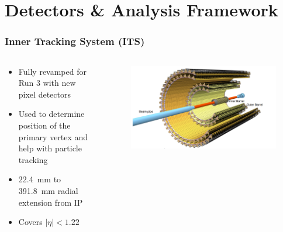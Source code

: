 \documentclass[11pt]{beamer}
\begin{document}
\section{Detectors \& Analysis Framework}

\begin{frame}
    \frametitle{Inner Tracking System (ITS)}

    \begin{columns}[c]
        \begin{column}{0.4\textwidth}
            \begin{itemize}
                \item Fully revamped for Run 3 with new pixel detectors
                \item Used to determine position of the primary vertex and help with particle tracking
                \item \SI{22.4}{\milli\metre} to \SI{391.8}{\milli\metre} radial extension from IP
                \item Covers $|\eta| < 1.22$
            \end{itemize}
        \end{column}

        \begin{column}{0.6\textwidth}
            \begin{figure}[h]
                \begin{center}
                    \includegraphics[width=\textwidth]{Figs/ITS_Schematic.png}
                \end{center}
            \end{figure}
        \end{column}
    \end{columns}

\end{frame}
\end{document}
